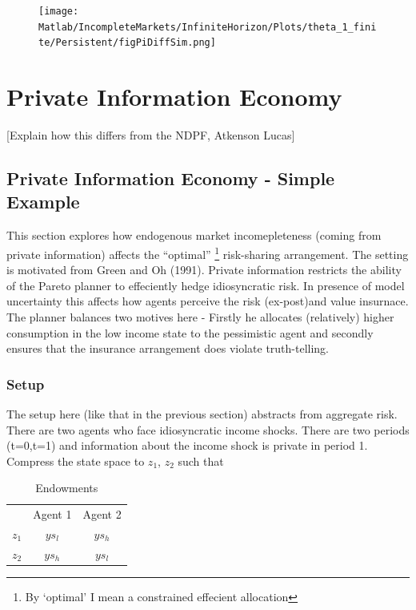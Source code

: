 \documentclass[12pt]{article}
\begin{document}
\begin{figure}[htbp]
\centering
{}
\caption{\small {}}
\end{figure} 
\begin{figure}[htbp]
\centering
	  \texttt{[image: Matlab/IncompleteMarkets/InfiniteHorizon/Plots/theta\_1\_finite/Persistent/figPiDiffSim.png]}

	\caption{ }
 
	\label{fig:figPiDiff}
\end{figure} 

\section{Private Information Economy}
[Explain how this differs from the NDPF, Atkenson Lucas]
\subsection{Private Information Economy - Simple Example}
This section explores how endogenous market incomepleteness (coming from private information) affects the ``optimal'' \footnote{By `optimal' I mean a constrained effecient allocation} risk-sharing arrangement. The setting is motivated from Green and Oh (1991). Private information restricts the ability of the Pareto planner to effeciently hedge idiosyncratic risk. In presence of model uncertainty this affects how agents perceive the risk (ex-post)and value insurnace. The planner balances two motives here - Firstly he allocates (relatively) higher consumption in the low income state to the pessimistic agent and  secondly ensures that the insurance arrangement does violate truth-telling.
 
\subsubsection{Setup}
The setup here (like that in the previous section) abstracts from aggregate risk. There are two agents who face idiosyncratic income shocks. There are two periods (t=0,t=1) and information about the income shock is private in period 1.
Compress the state space to $z_1$, $z_2$ such that

\begin{table}[h]
  \centering
  \begin{tabular}[h]{l c c}
    
& Agent 1 & Agent 2 \\
$z_1$ & $ys_l$ & $y s_h$  \\
$z_2$ & $ys_h$ & $ys_l$ \\
 
  \end{tabular}
  \caption{Endowments}
  
\end{table}
\end{document}
